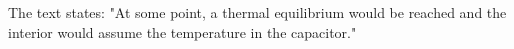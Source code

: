 The text states: "At some point, a thermal equilibrium would be reached and the interior would assume the temperature in the capacitor."